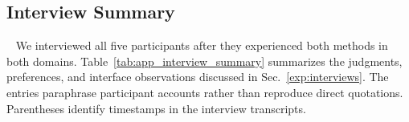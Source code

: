 

\subsection{Interview Summary}~\label{appx:user_interviews}
We interviewed all five participants after they experienced both methods in both domains. Table~\ref{tab:app_interview_summary} summarizes the judgments, preferences, and interface observations discussed in Sec.~\ref{exp:interviews}. The entries paraphrase participant accounts rather than reproduce direct quotations. Parentheses identify timestamps in the interview transcripts.

